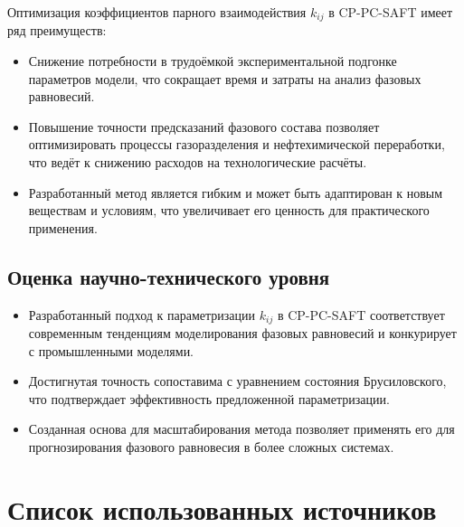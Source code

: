 \documentclass[a4paper,12pt]{article}
\begin{document}
Оптимизация коэффициентов парного взаимодействия \( k_{ij} \) в CP-PC-SAFT имеет ряд преимуществ:

\begin{itemize}
    \item Снижение потребности в трудоёмкой экспериментальной подгонке параметров модели, что сокращает время и затраты на анализ фазовых равновесий.
    \item Повышение точности предсказаний фазового состава позволяет оптимизировать процессы газоразделения и нефтехимической переработки, что ведёт к снижению расходов на технологические расчёты.
    \item Разработанный метод является гибким и может быть адаптирован к новым веществам и условиям, что увеличивает его ценность для практического применения.
\end{itemize}

\subsection{Оценка научно-технического уровня}

\begin{itemize}
    \item Разработанный подход к параметризации \( k_{ij} \) в CP-PC-SAFT соответствует современным тенденциям моделирования фазовых равновесий и конкурирует с промышленными моделями.
    \item Достигнутая точность сопоставима с уравнением состояния Брусиловского, что подтверждает эффективность предложенной параметризации.
    \item Созданная основа для масштабирования метода позволяет применять его для прогнозирования фазового равновесия в более сложных системах.
\end{itemize}

\newpage
\section*{Список использованных источников}
\printbibliography
\end{document}
